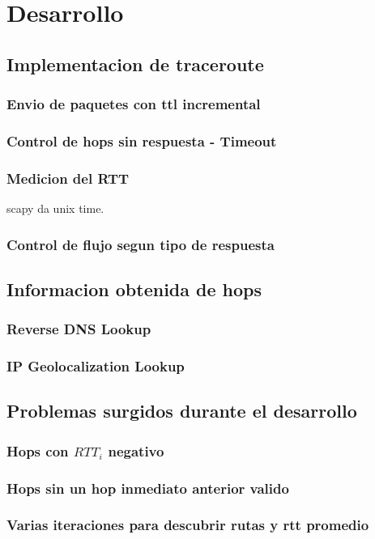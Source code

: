 \section{Desarrollo}
\subsection{Implementacion de traceroute}
\subsubsection{Envio de paquetes con ttl incremental}
\subsubsection{Control de hops sin respuesta - Timeout}
\subsubsection{Medicion del RTT}
scapy da unix time.
\subsubsection{Control de flujo segun tipo de respuesta}

\subsection{Informacion obtenida de hops}
\subsubsection{Reverse DNS Lookup}
\subsubsection{IP Geolocalization Lookup}

\subsection{Problemas surgidos durante el desarrollo}
\subsubsection{Hops con $RTT_i$ negativo}
\subsubsection{Hops sin un hop inmediato anterior valido}
\subsubsection{Varias iteraciones para descubrir rutas y rtt promedio}

